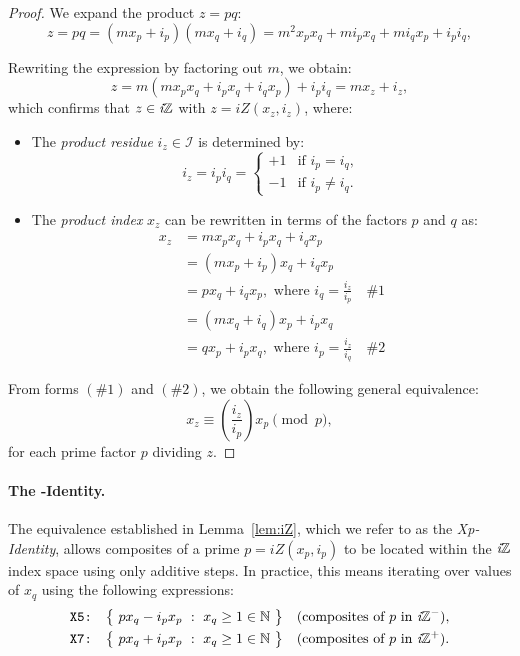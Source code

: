 \documentclass{article}
\begin{document}
\begin{proof} \label{proof:iZ}
We expand the product $z = pq$:
\[
z = pq = (m x_p + i_p)(m x_q + i_q) = m^2 x_p x_q + m i_p x_q + m i_q x_p + i_p i_q,
\]

Rewriting the expression by factoring out $m$, we obtain:
\[
z = m (m x_p x_q + i_p x_q + i_q x_p) + i_p i_q = m x_z + i_z,
\]
which confirms that $z \in \textit{i}\mathbb{Z}$ with $z = iZ(x_z, i_z)$, where:
\begin{itemize}
    \item The \emph{product residue} $i_z \in \mathcal{I}$ is determined by:
    $$
    i_z = i_p i_q = \begin{cases}
    +1 & \text{if } i_p = i_q,\\
    -1 & \text{if } i_p \neq i_q.
    \end{cases}
    $$
    
    \item The \emph{product index} $x_z$ can be rewritten in terms of the factors $p$ and $q$ as:
    \begin{align*}
    x_z &= m x_p x_q + i_p x_q + i_q x_p \\
        &= (m x_p + i_p) x_q + i_q x_p \\
        &= p x_q + i_q x_p, \text{ where } i_q = \frac{i_z}{i_p} \quad\#1 \\
        &= (m x_q + i_q) x_p + i_p x_q \\
        &= q x_p + i_p x_q, \text{ where } i_p = \frac{i_z}{i_q} \quad\#2
    \end{align*}
\end{itemize}
From forms $(\#1)$ and $(\#2)$, we obtain the following general equivalence:
\[
x_z \equiv (\frac{i_z}{i_p}) x_p \pmod{p},
\]
for each prime factor $p$ dividing $z$. 
\end{proof}

\newpage

\paragraph{The \Xp-Identity.}
The equivalence established in Lemma~\ref{lem:iZ}, which we refer to as the \emph{Xp-Identity}, allows composites of a prime $p = iZ(x_p, i_p)$ to be located within the $\textit{i}\mathbb{Z}$ index space using only additive steps. In practice, this means iterating over values of $x_q$ using the following expressions:
\[
\begin{aligned}
    \texttt{X5:}&\quad \big\{\ p x_q - i_p x_p\ :\ x_q \ge 1 \in\N\ \big\} \quad\text{(composites of $p$ in $\iZ^-$)},\\
    \texttt{X7:}&\quad \big\{\ p x_q + i_p x_p\ :\ x_q \ge 1 \in\N\ \big\} \quad\text{(composites of $p$ in $\iZ^+$)}.
\end{aligned}
\]
\end{document}
